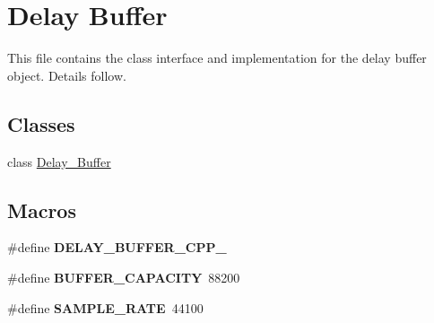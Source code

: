 \hypertarget{group__delay}{\section{Delay Buffer}
\label{group__delay}
}


This file contains the class interface and implementation for the delay buffer object. Details follow.  


\subsection*{Classes}
\begin{DoxyCompactItemize}
\item 
class \hyperlink{class_delay___buffer}{Delay\+\_\+\+Buffer}
\end{DoxyCompactItemize}
\subsection*{Macros}
\begin{DoxyCompactItemize}
\item 
\hypertarget{group__delay_gaef3865820e4634371db0261a9b0a9877}{\#define {\bfseries D\+E\+L\+A\+Y\+\_\+\+B\+U\+F\+F\+E\+R\+\_\+\+C\+P\+P\+\_\+}}\label{group__delay_gaef3865820e4634371db0261a9b0a9877}

\item 
\hypertarget{group__delay_ga473776433ac44bc525b8cd5186969b4b}{\#define {\bfseries B\+U\+F\+F\+E\+R\+\_\+\+C\+A\+P\+A\+C\+I\+T\+Y}~88200}\label{group__delay_ga473776433ac44bc525b8cd5186969b4b}

\item 
\hypertarget{group__delay_ga4b76a0c2859cfd819a343a780070ee2b}{\#define {\bfseries S\+A\+M\+P\+L\+E\+\_\+\+R\+A\+T\+E}~44100}\label{group__delay_ga4b76a0c2859cfd819a343a780070ee2b}

\end{DoxyCompactItemize}
